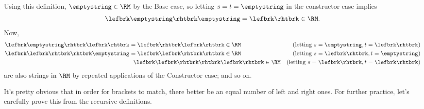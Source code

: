 Using this definition, $\emptystring \in\RM$ by the Base
case, so letting $s=t =\emptystring$ in the constructor case implies
\[
\lefbrk\emptystring\rhtbrk\emptystring=\lefbrk\rhtbrk\in\RM.
\]
Now,
\begin{align*}
\lefbrk\emptystring\rhtbrk\lefbrk\rhtbrk &= \lefbrk\rhtbrk\lefbrk\rhtbrk \in \RM
    & \text{(letting $s = \emptystring, t = \lefbrk\rhtbrk$)}\\
\lefbrk\lefbrk\rhtbrk\rhtbrk\emptystring & = \lefbrk\lefbrk\rhtbrk\rhtbrk \in \RM
    & \text{(letting $s = \lefbrk\rhtbrk, t = \emptystring$)}\\
&\ \ \lefbrk\lefbrk\rhtbrk\rhtbrk\lefbrk\rhtbrk \in \RM
    & \text{(letting $s = \lefbrk\rhtbrk, t = \lefbrk\rhtbrk$)}
\end{align*}
are also strings in $\RM$ by repeated applications of the Constructor
case; and so on.

\iffalse
If you haven't seen this kind of definition before, you should
try continuing this example to verify that
$\lefbrk\lefbrk\lefbrk\rhtbrk\rhtbrk\lefbrk\rhtbrk\rhtbrk\lefbrk\rhtbrk
\in \RM$.
\fi


\iffalse
Given the way this section is set up you might guess that $\RM = \GC$,
and you'd be right, but it's not completely obvious.  The proof is worked
out in Problem~\ref{PS_bracket_good_count}.
\fi

It's pretty obvious that in order for brackets to match, there better be
an equal number of left and right ones.  For further practice, let's
carefully prove this from the recursive definitions.

